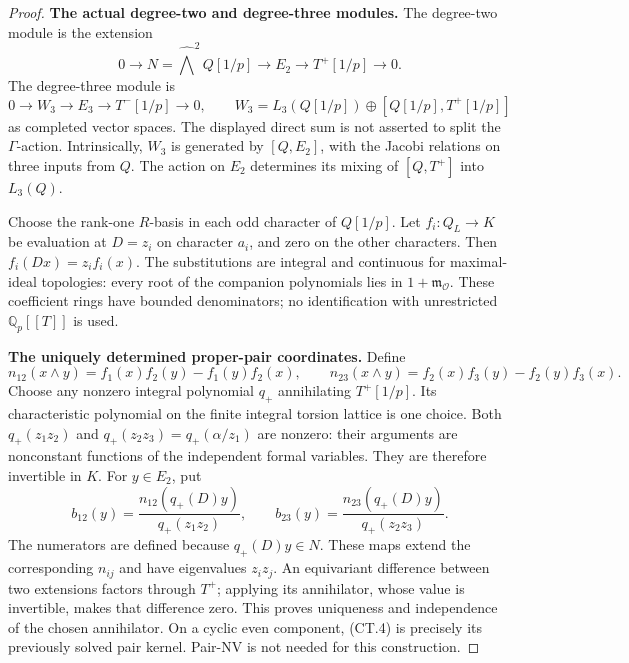 \documentclass[11pt,a4paper]{article}
\theoremstyle{definition}
\begin{document}
\begin{proof}
\par\medskip\noindent\textbf{The actual degree-two and degree-three modules.}
The degree-two module is the extension
\[
 0\longrightarrow N=\widehat{\bigwedge}^{2}Q[1/p]
 \longrightarrow E_2\longrightarrow T^+[1/p]\longrightarrow0.
 \tag{CT.2}
\]
The degree-three module is
\[
 0\longrightarrow W_3\longrightarrow E_3
 \longrightarrow T^-[1/p]\longrightarrow0,
 \qquad
 W_3=L_3(Q[1/p])\oplus[Q[1/p],T^+[1/p]]
 \tag{CT.3}
\]
as completed vector spaces. The displayed direct sum is not asserted to
split the \(\Gamma\)-action. Intrinsically, \(W_3\) is generated by
\([Q,E_2]\), with the Jacobi relations on three inputs from \(Q\).
The action on \(E_2\) determines its mixing of \([Q,T^+]\) into
\(L_3(Q)\).

Choose the rank-one \(R\)-basis in each odd character of \(Q[1/p]\).
Let \(f_i:Q_L\to K\) be evaluation at \(D=z_i\) on character
\(a_i\), and zero on the other characters. Then
\(f_i(Dx)=z_i f_i(x)\). The substitutions are integral and continuous
for maximal-ideal topologies: every root of the companion polynomials
lies in \(1+\mathfrak m_{\mathcal O}\). These coefficient rings have
bounded denominators; no identification with unrestricted
\(\mathbb Q_p[[T]]\) is used.

\par\medskip\noindent\textbf{The uniquely determined proper-pair coordinates.}
Define
\[
 n_{12}(x\wedge y)=f_1(x)f_2(y)-f_1(y)f_2(x),\qquad
 n_{23}(x\wedge y)=f_2(x)f_3(y)-f_2(y)f_3(x).
\]
Choose any nonzero integral polynomial \(q_+\) annihilating
\(T^+[1/p]\). Its characteristic polynomial on the finite integral
torsion lattice is one choice. Both
\(q_+(z_1z_2)\) and \(q_+(z_2z_3)=q_+(\alpha/z_1)\) are nonzero:
their arguments are nonconstant functions of the independent formal
variables. They are therefore invertible in \(K\). For \(y\in E_2\), put
\[
 b_{12}(y)=\frac{n_{12}(q_+(D)y)}{q_+(z_1z_2)},\qquad
 b_{23}(y)=\frac{n_{23}(q_+(D)y)}{q_+(z_2z_3)}.
 \tag{CT.4}
\]
The numerators are defined because \(q_+(D)y\in N\). These maps extend
the corresponding \(n_{ij}\) and have eigenvalues \(z_iz_j\).
An equivariant difference between two extensions factors through
\(T^+\); applying its annihilator, whose value is invertible, makes
that difference zero. This proves uniqueness and independence of the
chosen annihilator. On a cyclic even component, (CT.4) is precisely its
previously solved pair kernel. Pair-NV is not needed for this construction.


\end{proof}
\end{document}
